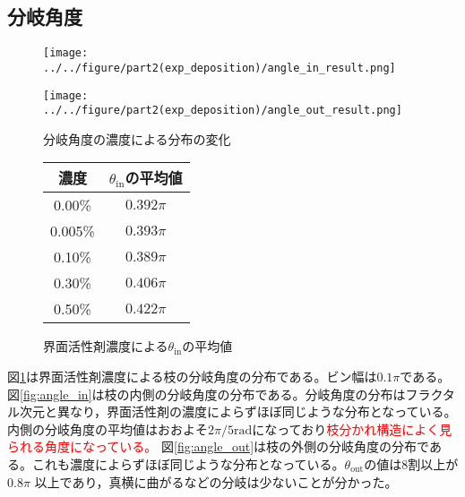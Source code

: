 \documentclass[autodetect-engine,dvi=dvipdfmx,a4paper,ja=standard,oneside,openany,11pt,draft]{bxjsbook}
\begin{document}
\subsection{分岐角度}
\begin{figure}[H]
  \begin{minipage}
    {0.45\textwidth}
    \centering
    \texttt{[image: ../../figure/part2(exp\_deposition)/angle\_in\_result.png]}
    \label{fig:angle_in}
  \end{minipage}
  \begin{minipage}
    {0.45\textwidth}
    \centering
    \texttt{[image: ../../figure/part2(exp\_deposition)/angle\_out\_result.png]}
    \label{fig:angle_out}
  \end{minipage}
  \caption{分岐角度の濃度による分布の変化}
  \label{fig:angle}
\end{figure}
\begin{wrapfigure}{r}{0.32\textwidth}
  \centering
  \caption{界面活性剤濃度による$\theta_{\mathrm{in}}$の平均値}
  \begin{tabular}{|c|c|}
    \hline
    濃度      & $\theta_{\mathrm{in}}$の平均値 \\
    \hline\hline
    0.00\%  & $0.392\pi$                 \\ \hline
    0.005\% & $0.393\pi$                 \\ \hline
    0.10\%  & $0.389\pi$                 \\ \hline
    0.30\%  & $0.406\pi$                 \\ \hline
    0.50\%  & $0.422\pi$                 \\
    \hline
  \end{tabular}
  \label{tab:angle_average}
\end{wrapfigure}
図\ref{fig:angle}は界面活性剤濃度による枝の分岐角度の分布である。ビン幅は$0.1\pi$である。図\ref{fig:angle_in}は枝の内側の分岐角度の分布である。分岐角度の分布はフラクタル次元と異なり，界面活性剤の濃度によらずほぼ同じような分布となっている。内側の分岐角度の平均値はおおよそ$2\pi/5 \mathrm{rad}$になっており\textcolor{red}{枝分かれ構造によく見られる角度になっている。}
図\ref{fig:angle_out}は枝の外側の分岐角度の分布である。これも濃度によらずほぼ同じような分布となっている。$\theta_{\mathrm{out}}$の値は8割以上が$0.8\pi$ 以上であり，真横に曲がるなどの分岐は少ないことが分かった。
\end{document}
